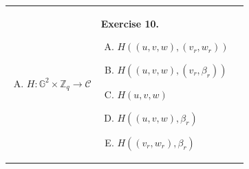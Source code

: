 \documentclass{zkdl-tests-template}
\begin{document}
\begin{tcolorbox}[colback=gray!10!white,fonttitle=\bfseries,colframe=purple!80!black,title=Exercises 6-10. Non-Interactive Chaum-Pedersen Protocol.]
\begin{center}
\begin{tabular}{p{5cm}p{5.15cm}p{6cm}}
\begin{enumerate}[A)]
                \item $H: \mathbb{G}^2 \times \mathbb{Z}_q \to \mathcal{C}$
            \end{enumerate} 
            &
            \textbf{Exercise 10.}
            \begin{enumerate}[A)]
                \item $H((u,v,w),(v_r,w_r))$
                \item $H((u,v,w),(v_r,\beta_r))$
                \item $H(u,v,w)$
                \item $H((u,v,w),\beta_r)$
                \item $H((v_r,w_r),\beta_r)$
            \end{enumerate} 
        \end{tabular}
    \end{center}
\end{tcolorbox}
\end{document}

